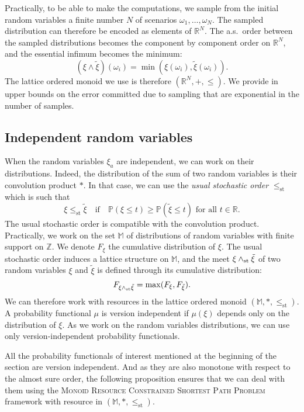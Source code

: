\documentclass[11pt]{amsart}
\theoremstyle{plain}
\theoremstyle{remark}
\def\R{\mathbb{R}}
\def\Z{\mathbb{Z}}
\def\P{\mathbb{P}}
\def\bbM{\mathbb{M}}
\newcommand{\MRCSP}{\textsc{Monoid Resource Constrained Shortest Path Problem}\xspace}
\newcommand{\leqst}{\leq_{\mathrm{st}}} \newcommand{\nleqst}{\nleq_{st}}
\newcommand{\meet}{\wedge} \newcommand{\bigmeet}{\bigwedge}
\begin{document}
Practically, to be able to make the computations, we sample from the initial random variables a finite number $N$ of scenarios $\omega_{1},\ldots,\omega_{N}$. The sampled distribution can therefore be encoded as elements of $\R^{N}$. The a.s.~order between the sampled distributions becomes the component by component order on $\R^{N}$, and the essential infimum becomes the minimum:
$$(\xi \meet \tilde{\xi})(\omega_{i}) = \min(\xi(\omega_{i}),\tilde{\xi}(\omega_{i})).$$
The lattice ordered monoid we use is therefore $(\R^{N}, +, \leq)$. We provide in \cite{parmentier2016thesis} upper bounds on the error committed due to sampling that are exponential in the number of samples.

\subsection{Independent random variables} \label{sub:independent_random_variables}

When the random variables $\xi_{a}$ are independent, we can work on their distributions. Indeed, the distribution of the sum of two random variables is their convolution product $\ast$. In that case, we can use the \emph{usual stochastic order} $\leqst$ which is such that
$$ \xi \leqst \tilde{\xi} \quad \text{if} \quad \P(\xi \leq t) \geq \P(\tilde{\xi} \leq t) \text{ for all }t\in \R. $$ 
The usual stochastic order is compatible with the convolution product. Practically, we work on the set $\bbM$ of distributions of random variables with finite support on $\Z$. We denote $F_{\xi}$ the cumulative distribution of $\xi$. The usual stochastic order induces a lattice structure on $\bbM$, and the meet $\xi \meetst \tilde{\xi}$ of two random variables $\xi$ and $\tilde{\xi}$ is defined through its cumulative distribution:
$$ F_{\xi \meetst \tilde{\xi}} = \max(F_{\xi},F_{\tilde{\xi}}).$$
We can therefore work with resources in the lattice ordered monoid $(\bbM,\ast,\leqst)$. A probability functional $\mu$ is version independent if $\mu(\xi)$ depends only on the distribution of $\xi$. As we work on the random variables distributions, we can use only version-independent probability functionals. 

All the probability functionals of interest mentioned at the beginning of the section are version independent. And as they are also monotone with respect to the almost sure order, the following proposition ensures that we can deal with them using the \MRCSP framework with resource in $(\bbM,\ast,\leqst)$.
\end{document}
